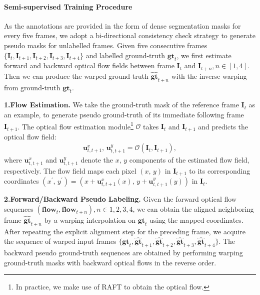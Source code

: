 \documentclass[10pt,twocolumn,letterpaper]{article}
\begin{document}
\paragraph{Semi-supervised Training Procedure}\label{sec:pseudo_label} 
\vspace{-5pt}
As the annotations are provided in the form of dense segmentation masks  for every five frames, we adopt a bi-directional consistency check strategy to generate pseudo masks for unlabelled frames.
Given five consecutive frames $\{\mathbf{I}_{t},\mathbf{I}_{t+1},\mathbf{I}_{t+2},\mathbf{I}_{t+3},\mathbf{I}_{t+4}\}$ and labelled ground-truth $\mathbf{gt}_{t}$, we first estimate forward and backward optical flow fields between frame $\mathbf{I}_{t}$ and $\mathbf{I}_{t+n}, n\in [1, 4]$. Then we can produce the warped ground-truth $\hat{\mathbf{gt}}_{t+n}$ with the inverse warping from ground-truth $\mathbf{gt}_{t}$.

\textbf{1.Flow Estimation.}
We take the ground-truth mask of the reference frame $\mathbf{I}_t$ as an example, to generate pseudo ground-truth of its immediate following frame $\mathbf{I}_{t+1}$. The optical flow estimation module\footnote{In practice, we make use of RAFT \cite{teed2020raft} to obtain the optical flow.} $\mathcal{O}$ takes $\mathbf{I}_t$ and $\mathbf{I}_{t+1}$ and predicts the optical flow field:
\begin{align}
\mathbf{u}_{t, t+1}^x,\,\mathbf{u}_{t, t+1}^y = \mathcal{O}(\mathbf{I}_t, \mathbf{I}_{t+1}),
\end{align}
where $\mathbf{u}_{t, t+1}^x$ and $\mathbf{u}_{t, t+1}^y$ denote the $x,\,y$ components of the estimated flow field, respectively. The flow field maps each pixel $(x,\,y)$ in ${\mathbf{I}}_{t+1}$ to its corresponding coordinates 
$(x^{\prime},\,y^{\prime})=(x+\mathbf{u}_{t,t+1}^x(x),\,y+\mathbf{u}_{t,t+1}^y(y))$ in ${\mathbf{I}}_{t}$.

\textbf{2.Forward/Backward Pseudo Labeling.}
Given the forward optical flow sequences $(\mathbf{flow}_{t}, \mathbf{flow}_{t+n}), n\in{1,2,3,4}$, we can obtain the aligned neighboring frame $\hat{\mathbf{gt}}_{t+n}$ by a warping interpolation on $\mathbf{gt}_{t}$ using the mapped coordinates. After repeating the explicit alignment step for the preceding frame, we acquire the sequence of warped input frames $\{\mathbf{gt}_{t},\hat{\mathbf{gt}}_{t+1},\hat{\mathbf{gt}}_{t+2},\hat{\mathbf{gt}}_{t+3},\hat{\mathbf{gt}}_{t+4}\}$. The backward pseudo ground-truth sequences are obtained by performing warping ground-truth masks with backward optical flows in the reverse order.
\end{document}
